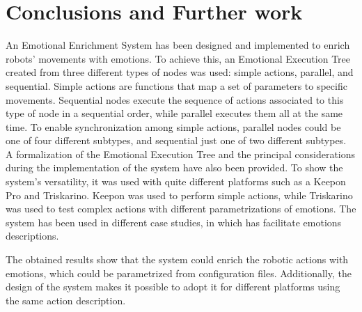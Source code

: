 \documentclass[letterpaper, 10 pt, conference]{ieeeconf}  %
\begin{document}
\section{Conclusions and Further work}
An Emotional Enrichment System has been designed and implemented to enrich robots' movements with emotions. To achieve this,  an Emotional Execution Tree created from three different types of nodes was used: simple actions, parallel, and sequential. Simple actions are functions that map a set of parameters to specific movements. Sequential nodes execute the sequence of actions associated to this type of node in a sequential order, while parallel executes them all at the same time. To enable synchronization among simple actions, parallel nodes could be one of four different subtypes, and sequential just one of two different subtypes. A formalization of the Emotional Execution Tree and the principal considerations during the implementation of the system have also been provided. To show the system's versatility, it was used with quite different platforms such as a Keepon Pro and Triskarino. Keepon was used to perform simple actions, while Triskarino was used to test complex actions with different parametrizations of emotions. The system has been used in different case studies, in which has facilitate emotions descriptions.

The obtained results show that the system could enrich the robotic actions with emotions, which could be parametrized from configuration files. Additionally, the design of the system makes it possible to  adopt it for different platforms using the same action description.
%



\addtolength{\textheight}{-12cm}
\end{document}
